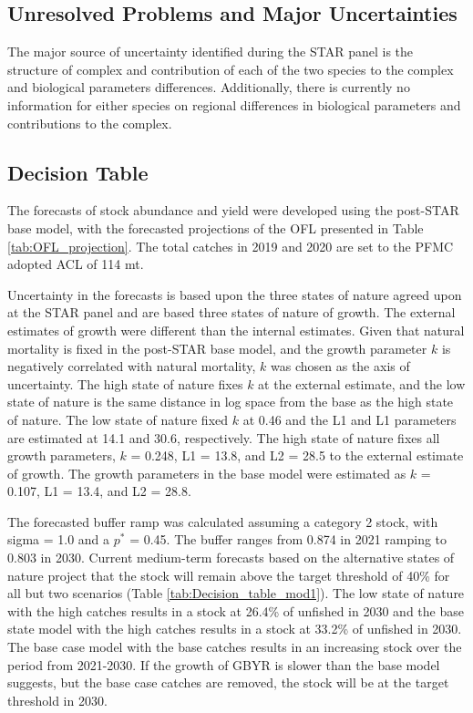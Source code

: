 \documentclass[12pt,]{article}
\begin{document}
\FloatBarrier

\subsection*{Unresolved Problems and Major
Uncertainties}\label{unresolved-problems-and-major-uncertainties}

The major source of uncertainty identified during the STAR panel is the
structure of complex and contribution of each of the two species to the
complex and biological parameters differences. Additionally, there is
currently no information for either species on regional differences in
biological parameters and contributions to the complex.

\FloatBarrier

\subsection*{Decision Table}\label{decision-table}

The forecasts of stock abundance and yield were developed using the
post-STAR base model, with the forecasted projections of the OFL
presented in Table \ref{tab:OFL_projection}. The total catches in 2019
and 2020 are set to the PFMC adopted ACL of 114 mt.

Uncertainty in the forecasts is based upon the three states of nature
agreed upon at the STAR panel and are based three states of nature of
growth. The external estimates of growth were different than the
internal estimates. Given that natural mortality is fixed in the
post-STAR base model, and the growth parameter \(k\) is negatively
correlated with natural mortality, \(k\) was chosen as the axis of
uncertainty. The high state of nature fixes \(k\) at the external
estimate, and the low state of nature is the same distance in log space
from the base as the high state of nature. The low state of nature fixed
\(k\) at 0.46 and the L1 and L1 parameters are estimated at 14.1 and
30.6, respectively. The high state of nature fixes all growth
parameters, \(k\) = 0.248, L1 = 13.8, and L2 = 28.5 to the external
estimate of growth. The growth parameters in the base model were
estimated as \(k\) = 0.107, L1 = 13.4, and L2 = 28.8.

The forecasted buffer ramp was calculated assuming a category 2 stock,
with sigma = 1.0 and a \(p^*\) = 0.45. The buffer ranges from 0.874 in
2021 ramping to 0.803 in 2030. Current medium-term forecasts based on
the alternative states of nature project that the stock will remain
above the target threshold of 40\% for all but two scenarios (Table
\ref{tab:Decision_table_mod1}). The low state of nature with the high
catches results in a stock at 26.4\% of unfished in 2030 and the base
state model with the high catches results in a stock at 33.2\% of
unfished in 2030. The base case model with the base catches results in
an increasing stock over the period from 2021-2030. If the growth of
GBYR is slower than the base model suggests, but the base case catches
are removed, the stock will be at the target threshold in 2030.
\end{document}
